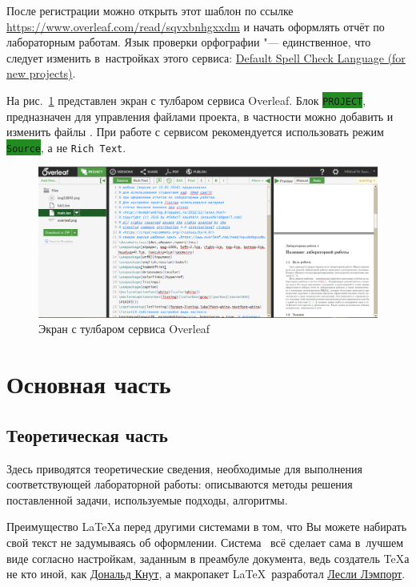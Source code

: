 После регистрации можно открыть этот шаблон по ссылке \url{https://www.overleaf.com/read/sqvxbnhgxxdm} и начать оформлять отчёт по лабораторным работам.
Язык проверки орфографии "--- единственное, что следует изменить в~настройках этого сервиса: \href{https://www.overleaf.com/users/edit#!accountsettings}{Default Spell Check Language (for new projects)}.

На рис.~\ref{fig:overleaf} представлен  экран с тулбаром сервиса Overleaf.
Блок \colorbox{ForestGreen}{\color{white}\verb"PROJECT"}, предназначен для управления файлами проекта, в частности можно добавить и изменить файлы 
.
При работе с сервисом рекомендуется использовать режим \colorbox{ForestGreen}{\color{white}\texttt{Source}}, а не
\texttt{Rich Text}.

\begin{figure}[h!]
\centering
\includegraphics[width=.98\textwidth]{overleaf}

\caption{Экран с тулбаром сервиса Overleaf}
\label{fig:overleaf}
\end{figure}

\section{Основная часть}

\subsection{Теоретическая часть}

Здесь приводятся теоретические сведения, необходимые для выполнения соответствующей лабораторной работы: описываются методы решения поставленной задачи, используемые подходы, алгоритмы.

Преимущество \LaTeX{а} перед другими системами в том, что Вы можете набирать свой текст не задумываясь об оформлении. 
Система \ всё сделает сама в~лучшем виде согласно настройкам, заданным в преамбуле документа, ведь создатель \TeX{а}  не кто иной, как \href{https://ru.wikipedia.org/wiki/%D0%9A%D0%BD%D1%83%D1%82,_%D0%94%D0%BE%D0%BD%D0%B0%D0%BB%D1%8C%D0%B4_%D0%AD%D1%80%D0%B2%D0%B8%D0%BD}{Дональд Кнут}, 
а макропакет \LaTeX\ разработал \href{https://ru.wikipedia.org/wiki/%D0%9B%D1%8D%D0%BC%D0%BF%D0%BE%D1%80%D1%82,_%D0%9B%D0%B5%D1%81%D0%BB%D0%B8}{Лесли Лэмпорт}.

